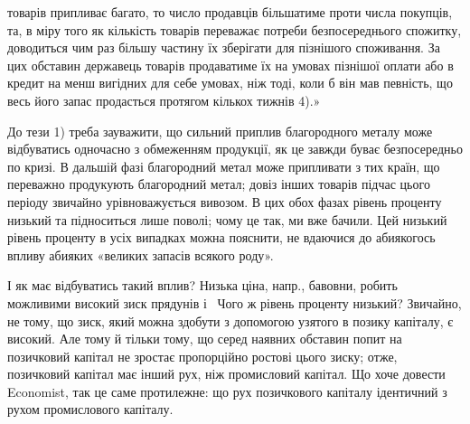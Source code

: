 \parcont{}  %
товарів припливає багато, то число продавців більшатиме проти числа покупців, та,
в міру того як кількість товарів переважає потреби безпосереднього спожитку,
доводиться чим раз більшу частину їх зберігати для пізнішого споживання. За цих
обставин державець товарів продаватиме їх на умовах пізнішої оплати або
в кредит на менш вигідних для себе умовах, ніж тоді, коли б він мав певність,
що весь його запас продасться протягом кількох тижнів 4).»

До тези 1) треба зауважити, що сильний приплив благородного металу
може відбуватись одночасно з обмеженням продукції, як це завжди
буває безпосередньо по кризі. В дальшій фазі благородний метал може припливати
з тих країн, що переважно продукують благородний метал; довіз
інших товарів підчас цього періоду звичайно урівноважується вивозом. В цих
обох фазах рівень проценту низький та підноситься лише поволі; чому це так,
ми вже бачили. Цей низький рівень проценту в усіх випадках можна пояснити,
не вдаючися до абиякогось впливу абияких «великих запасів всякого роду».

І як має відбуватись такий вплив? Низька ціна, напр., бавовни, робить можливими
високий зиск прядунів і~ Чого ж рівень проценту низький? Звичайно,
не тому, що зиск, який можна здобути з допомогою узятого в позику
капіталу, є високий. Але тому й тільки тому, що серед наявних обставин попит
на позичковий капітал не зростає пропорційно ростові цього зиску; отже, позичковий
капітал має інший рух, ніж промисловий капітал. Що хоче довести
Economist, так це саме протилежне: що рух позичкового капіталу ідентичний
з рухом промислового капіталу.

